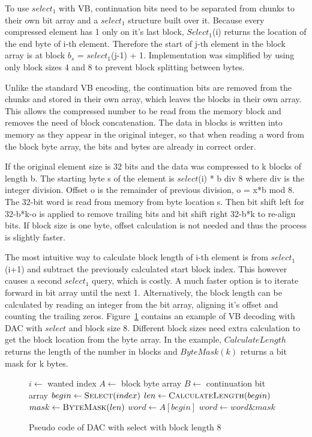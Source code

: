 To use $select_1$ with VB, continuation bits need to be separated from chunks to their own bit array and a $select_1$ structure built over it. Because every compressed element has 1
only on it's last block, $Select_1$(i) returns the location of the end byte of i-th element. Therefore the start of j-th element in the block array is at 
block $b_s$ = $select_1$(j-1) + 1. Implementation was simplified by using only block sizes 4 and 8 to prevent block splitting between bytes.

Unlike the standard VB encoding, the continuation bits are removed from the chunks and stored in their own array, which leaves the blocks in their own array. This allows the 
compressed number to be read from the memory block and removes the need of block concatenation. The data in blocks is written into memory as they appear in the original integer, so that 
when reading a word from the block byte array, the bits and bytes are already in correct order. 

If the original element size is 32 bits and the data was compressed to k blocks of length b. The starting byte s of the element is $select$(i) * b div 8 where div is the integer division. 
Offset o is the remainder of previous division, o = x*b mod 8. The 32-bit word is read from memory from byte location s. Then bit shift left for 32-b*k-o is applied to remove trailing 
bits and bit shift right 32-b*k to re-align bits. If block size is one byte, offset calculation is not needed and thus the process is slightly faster.

The most intuitive way to calculate block length of i-th element is from $select_1$(i+1) and subtract the previously calculated start block index. This however causes a second 
$select_1$ query, which is costly. A much faster option is to iterate forward in bit array until the next 1. Alternatively, the block length can be calculated by reading an integer 
from the bit array, aligning it's offset and counting the trailing zeros. Figure~\ref{select_pseudo} contains an example of VB decoding with DAC with $select$ and block size 8. 
Different block sizes need extra calculation to get the block location from the byte array. In the example, $CalculateLength$ returns the length of the number in blocks and $ByteMask(k)$ returns 
a bit mask for k bytes. 

\begin{figure}[ht]
\centering
\begin{algorithmic}
\State $i \gets $ wanted index
\State $A \gets $ block byte array
\State $B \gets $ continuation bit array
\State $begin \gets \Call{Select}{index}$
\State $len \gets \Call{CalculateLength}{begin}$
\State $mask \gets \Call{ByteMask}{len}$
\State $word \gets A[begin]$ 
\State $word \gets word \mathbin{\&} mask$ 


\end{algorithmic}
\caption{Pseudo code of DAC with select with block length 8} \label{select_pseudo}
\end{figure}

